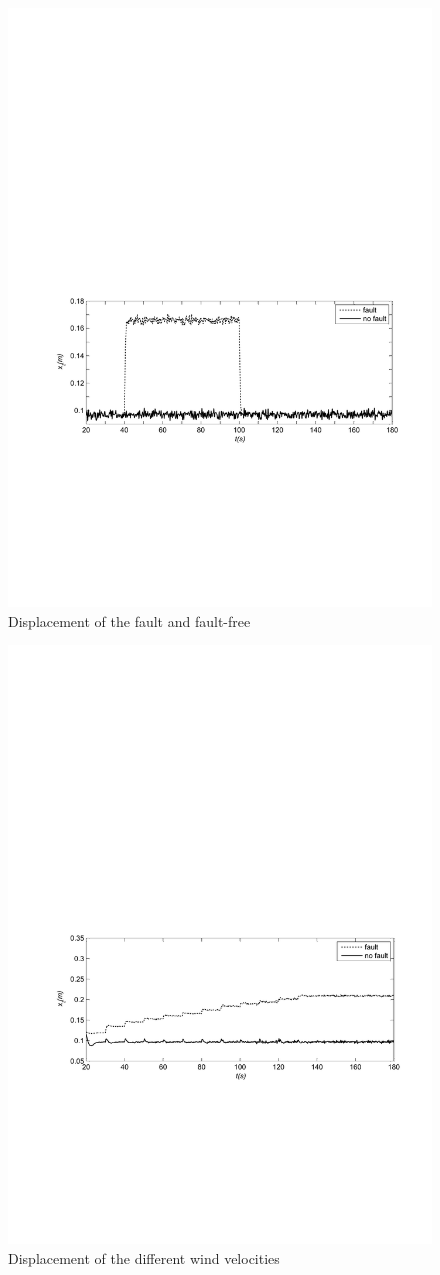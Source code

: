\documentclass{article}
\begin{document}
\begin{figure}[H]
  \centering
  \includegraphics[width=0.8\hsize]{MATLAB-fault1.pdf}
  \caption{Displacement of the fault and fault-free}
  \label{fig:fault1}
\end{figure}

\begin{figure}[H]
  \centering
  \includegraphics[width=0.8\hsize]{MATLAB-fault5.pdf}
  \caption{Displacement of the different wind velocities}
  \label{fig:fault5}
\end{figure}
\end{document}
